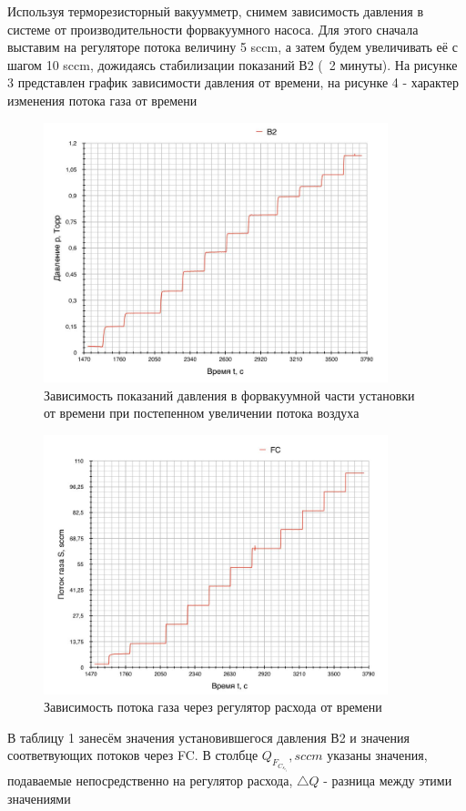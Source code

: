 \documentclass{article}
\begin{document}
Используя терморезисторный вакуумметр, снимем зависимость давления в системе от производительности форвакуумного насоса. Для этого сначала выставим на регуляторе потока величину 5 sccm, а затем будем увеличивать её с шагом 10 sccm, дожидаясь стабилизации показаний В2 (~2 минуты). На рисунке 3 представлен график зависимости давления от времени, на рисунке 4 - характер изменения потока газа от времени 
\begin{figure}[H]
    \centering
    \includegraphics[width=10cm]{torr_up.jpg}
    \caption{Зависимость показаний давления в форвакуумной части установки от времени при постепенном увеличении потока воздуха}
    \label{fig:vac}
\end{figure}

\begin{figure}[H]
    \centering
    \includegraphics[width=10cm]{sccm_up.jpg}
    \caption{Зависимость потока газа через регулятор расхода от времени}
    \label{fig:vac}
\end{figure}


В таблицу 1 занесём значения установившегося давления В2 и значения соответвующих потоков через FC. В столбце $Q_F_C_s_e_t, sccm$ указаны значения, подаваемые непосредственно на регулятор расхода, $\triangle Q$ - разница между этими значениями
\end{document}
